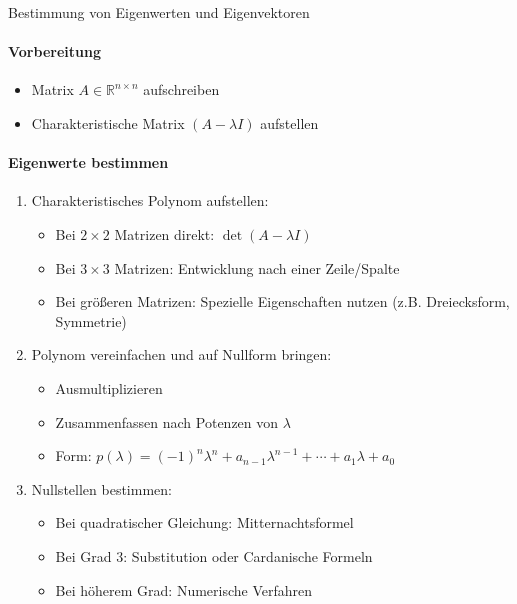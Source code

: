 \begin{KR}{Bestimmung von Eigenwerten und Eigenvektoren}
\paragraph{Vorbereitung}
\begin{itemize}
    \item Matrix $A \in \mathbb{R}^{n \times n}$ aufschreiben
    \item Charakteristische Matrix $(A - \lambda I)$ aufstellen
\end{itemize}

\paragraph{Eigenwerte bestimmen}
\begin{enumerate}
    \item Charakteristisches Polynom aufstellen:
    \begin{itemize}
        \item Bei $2 \times 2$ Matrizen direkt: $\det(A - \lambda I)$
        \item Bei $3 \times 3$ Matrizen: Entwicklung nach einer Zeile/Spalte
        \item Bei größeren Matrizen: Spezielle Eigenschaften nutzen
              (z.B. Dreiecksform, Symmetrie)
    \end{itemize}
    
    \item Polynom vereinfachen und auf Nullform bringen:
    \begin{itemize}
        \item Ausmultiplizieren
        \item Zusammenfassen nach Potenzen von $\lambda$
        \item Form: $p(\lambda) = (-1)^n\lambda^n + a_{n-1}\lambda^{n-1} + \cdots + a_1\lambda + a_0$
    \end{itemize}

    \item Nullstellen bestimmen:
    \begin{itemize}
        \item Bei quadratischer Gleichung: Mitternachtsformel
        \item Bei Grad 3: Substitution oder Cardanische Formeln
        \item Bei höherem Grad: Numerische Verfahren
    \end{itemize}
\end{enumerate}


\end{KR}
